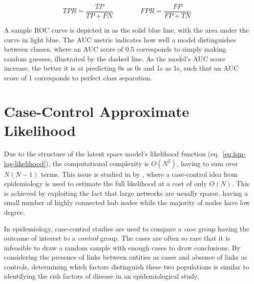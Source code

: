     \begin{equation}\label{eq:eval-tpr-fpr}
        TPR = \frac{TP}{TP + FN} \qquad\qquad FPR = \frac{FP}{FP + TN}
    \end{equation}
    
    A sample ROC curve is depicted in  as the solid blue line, with the area under the curve in light blue.
    The AUC metric indicates how well a model distinguishes between classes, where an AUC score of 0.5 corresponds to simply making random guesses, illustrated by the dashed line. As the model's AUC score increase, the better it is at predicting 0s as 0s and 1s as 1s, such that an AUC score of 1 corresponds to perfect class separation.
    

\section{Case-Control Approximate Likelihood}

    Due to the structure of the latent space model's likelihood function (eq.~\ref{eq:lsm-log-likelihood}), the computational complexity is $O(N^2)$, having to sum over $N(N-1)$ terms. This issue is studied in \cite{raftery2012fast} by \citeauthor{raftery2012fast}, where a case-control idea from epidemiology is used to estimate the full likelihood at a cost of only $O(N)$. This is achieved by exploiting the fact that large networks are usually sparse, having a small number of highly connected hub nodes while the majority of nodes have low degree.
    
    In epidemiology, case-control studies are used to compare a \emph{case} group having the outcome of interest to a \emph{control} group. The cases are often so rare that it is infeasible to draw a random sample with enough cases to draw conclusions.
    By considering the presence of links between entities as cases and absence of links as controls, determining which factors distinguish these two populations is similar to identifying the risk factors of disease in an epidemiological study.
    
